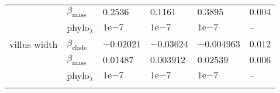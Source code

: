 \documentclass[12pt,]{article}
\begin{document}
\begin{table}[t]
\begin{tabular}{llllll}
 & $\beta_{\text{mass}}$ & $0.2536$ & $0.1161$ & $0.3895$ & $0.004$\\
 & phylo$_{\lambda}$ & $1 \mathrm{e}{-7}$ & $1 \mathrm{e}{-7}$ & $1 \mathrm{e}{-7}$ & –\\
\addlinespace
villus width & $\beta_{\text{clade}}$ & $-0.02021$ & $-0.03624$ & $-0.004963$ & $0.012$\\
 & $\beta_{\text{mass}}$ & $0.01487$ & $0.003912$ & $0.02539$ & $0.006$\\
 & phylo$_{\lambda}$ & $1 \mathrm{e}{-7}$ & $1 \mathrm{e}{-7}$ & $1 \mathrm{e}{-7}$ & –\\
\addlinespace
\bottomrule
\end{tabular}
\end{table}

\begin{table}[t]


\end{table}
\end{document}
